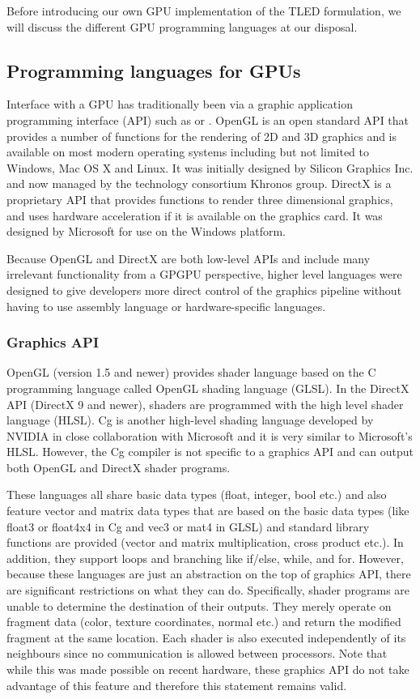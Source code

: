 Before introducing our own GPU implementation of the TLED formulation, we will discuss the different GPU programming languages at our disposal. 


	\subsection{Programming languages for GPUs}

Interface with a GPU has traditionally been via a graphic application programming interface (API) such as  or . OpenGL is an open standard API that provides a number of functions for the rendering of 2D and 3D graphics and is available on most modern operating systems including but not limited to Windows, Mac OS X and Linux. It was initially designed by Silicon Graphics Inc. and now managed by the technology consortium Khronos group. DirectX is a proprietary API that provides functions to render three dimensional graphics, and uses hardware acceleration if it is available on the graphics card. It was designed by Microsoft for use on the Windows platform. 

Because OpenGL and DirectX are both low-level APIs and include many irrelevant functionality from a GPGPU perspective, higher level languages were designed to give developers more direct control of the graphics pipeline without having to use assembly language or hardware-specific languages. 
	
		\subsubsection*{Graphics API}
OpenGL (version 1.5 and newer) provides shader language based on the C programming language called OpenGL shading language (GLSL). In the DirectX API (DirectX 9 and newer), shaders are programmed with the high level shader language (HLSL). Cg is another high-level shading language developed by NVIDIA in close collaboration with Microsoft and it is very similar to Microsoft's HLSL. However, the Cg compiler is not specific to a graphics API and can output both OpenGL and DirectX shader programs. 

These languages all share basic data types (float, integer, bool etc.) and also feature vector and matrix data types that are based on the basic data types (like float3 or float4x4 in Cg and vec3 or mat4 in GLSL) and standard library functions are provided (vector and matrix multiplication, cross product etc.). In addition, they support loops and branching like if/else, while, and for. However, because these languages are just an abstraction on the top of graphics API, there are significant restrictions on what they can do. Specifically, shader programs are unable to determine the destination of their outputs. They merely operate on fragment data (color, texture coordinates, normal etc.) and return the modified fragment at the same location. Each shader is also executed independently of its neighbours since no communication is allowed between processors. Note that while this was made possible on recent hardware, these graphics API do not take advantage of this feature and therefore this statement remains valid. 

